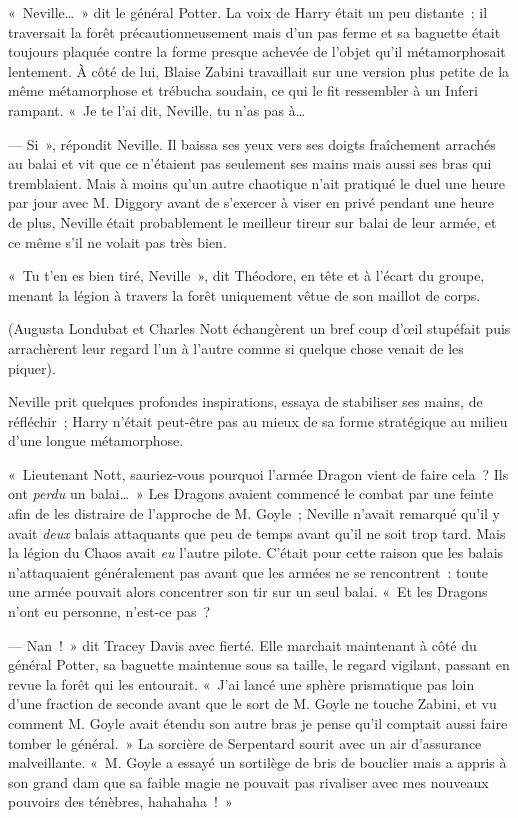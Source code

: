 «~Neville…~»
dit le général Potter.
La voix de Harry était un peu distante~; il traversait la forêt précautionneusement mais d'un pas ferme et sa baguette était toujours plaquée contre la forme presque achevée de l'objet qu'il métamorphosait lentement.
À côté de lui, Blaise Zabini travaillait sur une version plus petite de la même métamorphose et trébucha soudain, ce qui le fit ressembler à un Inferi rampant.
«~Je te l'ai dit, Neville, tu n'as pas à…

--- Si~», répondit Neville.
Il baissa ses yeux vers ses doigts fraîchement arrachés au balai et vit que ce n'étaient pas seulement ses mains mais aussi ses bras qui tremblaient.
Mais à moins qu'un autre chaotique n'ait pratiqué le duel une heure par jour avec M. Diggory avant de s'exercer à viser en privé pendant une heure de plus, Neville était probablement le meilleur tireur sur balai de leur armée, et ce même s'il ne volait pas très bien.

«~Tu t'en es bien tiré, Neville~», dit Théodore, en tête et à l'écart du groupe, menant la légion à travers la forêt uniquement vêtue de son maillot de corps.

(Augusta Londubat et Charles Nott échangèrent un bref coup d'œil stupéfait puis arrachèrent leur regard l'un à l'autre comme si quelque chose venait de les piquer).

Neville prit quelques profondes inspirations, essaya de stabiliser ses mains, de réfléchir~; Harry n'était peut-être pas au mieux de sa forme stratégique au milieu d'une longue métamorphose.

«~Lieutenant Nott, sauriez-vous pourquoi l'armée Dragon vient de faire cela~?
Ils ont \emph{perdu} un balai…~»
Les Dragons avaient commencé le combat par une feinte afin de les distraire de l'approche de M. Goyle~; Neville n'avait remarqué qu'il y avait \emph{deux} balais attaquants que peu de temps avant qu'il ne soit trop tard.
Mais la légion du Chaos avait \emph{eu} l'autre pilote.
C'était pour cette raison que les balais n'attaquaient généralement pas avant que les armées ne se rencontrent~: toute une armée pouvait alors concentrer son tir sur un seul balai.
«~Et les Dragons n'ont eu personne, n'est-ce pas~?

--- Nan~!~»
dit Tracey Davis avec fierté.
Elle marchait maintenant à côté du général Potter, sa baguette maintenue sous sa taille, le regard vigilant, passant en revue la forêt qui les entourait.
«~J'ai lancé une sphère prismatique pas loin d'une fraction de seconde avant que le sort de M. Goyle ne touche Zabini, et vu comment M. Goyle avait étendu son autre bras je pense qu'il comptait aussi faire tomber le général.~»
La sorcière de Serpentard sourit avec un air d'assurance malveillante.
«~M. Goyle a essayé un sortilège de bris de bouclier mais a appris à son grand dam que sa faible magie ne pouvait pas rivaliser avec mes nouveaux pouvoirs des ténèbres, hahahaha~!~»

